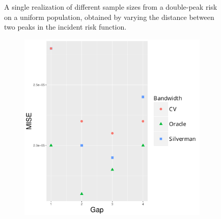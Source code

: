\begin{figure}[htbp]
\begin{subfigure}{0.45\textwidth}
        \label{fig:one_sample:p1.4_100_G:4}
    \end{subfigure}
    \caption[Examples showing distance between two peaks]
        {A single realization of different sample sizes from a double-peak risk on a uniform population, obtained by varying the distance between two peaks in the incident risk function.}
    \label{fig:one_sample:p1.4_100_G}
\end{figure}


\begin{figure}[htbp]
    \centering
    \begin{subfigure}[b]{0.24\textwidth}
        \includegraphics[width=\textwidth]{results/by_two_peaks/MISE-vs-risk-peak-gap}
        \caption{}
    \end{subfigure}
    \begin{subfigure}[b]{0.24\textwidth}

\end{subfigure}
\end{figure}
